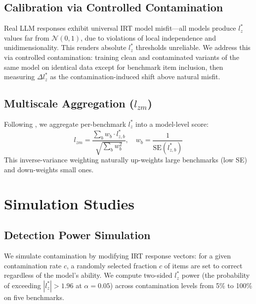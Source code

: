 \documentclass[11pt,a4paper]{article}
\begin{document}
\subsection{Calibration via Controlled Contamination}

Real LLM responses exhibit universal IRT model misfit---all models produce $l_{z}^{*}$ values far from $\mathcal{N}(0,1)$, due to violations of local independence and unidimensionality.
This renders absolute $l_{z}^{*}$ thresholds unreliable.
We address this via controlled contamination: training clean and contaminated variants of the same model on identical data except for benchmark item inclusion, then measuring $\Delta l_{z}^{*}$ as the contamination-induced shift above natural misfit.

\subsection{Multiscale Aggregation ($l_{zm}$)}

Following \citet{hong2021multiscale}, we aggregate per-benchmark $l_{z}^{*}$ into a model-level score:
\begin{equation}
    l_{zm} = \frac{\sum_b w_b \cdot l_{z,b}^{*}}{\sqrt{\sum_b w_b^2}}, \quad w_b = \frac{1}{\text{SE}(l_{z,b}^{*})}
\end{equation}
This inverse-variance weighting naturally up-weights large benchmarks (low SE) and down-weights small ones.

\section{Simulation Studies}

\subsection{Detection Power Simulation}
\label{sec:sim-power}

We simulate contamination by modifying IRT response vectors: for a given contamination rate $c$, a randomly selected fraction $c$ of items are set to correct regardless of the model's ability.
We compute two-sided $l_{z}^{*}$ power (the probability of exceeding $|l_{z}^{*}|>1.96$ at $\alpha=0.05$) across contamination levels from 5\% to 100\% on five benchmarks.
\end{document}

